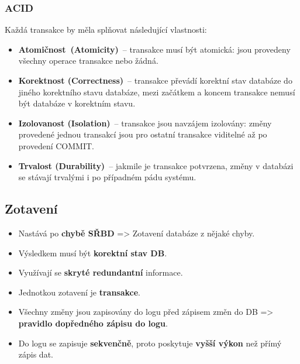 \subsubsection{ACID}
Každá transakce by měla splňovat následující vlastnosti:
\begin{itemize}
\item\textbf{Atomičnost (Atomicity)} -- transakce musí být atomická: jsou provedeny všechny operace transakce nebo žádná.
\item\textbf{Korektnost (Correctness)} – transakce převádí korektní stav databáze do jiného korektního stavu databáze, mezi začátkem a koncem transakce nemusí být databáze v korektním stavu.
\item\textbf{Izolovanost (Isolation)} – transakce jsou navzájem izolovány: změny provedené jednou transakcí jsou pro ostatní transakce viditelné až po provedení COMMIT. 
\item\textbf{Trvalost (Durability)} – jakmile je transakce potvrzena, změny v databázi se stávají trvalými i po případném pádu systému.
\end{itemize}

\subsection{Zotavení}
\begin{itemize}
\item Nastává po \textbf{chybě SŘBD} => Zotavení databáze z nějaké chyby.
\item Výsledkem musí být \textbf{korektní stav DB}.
\item Využívají se\textbf{ skryté redundantní} informace.
\item Jednotkou zotavení je \textbf{transakce}.
\item Všechny změny jsou zapisovány do logu před zápisem změn do DB => \textbf{pravidlo dopředného zápisu do logu}.
\item Do logu se zapisuje \textbf{sekvenčně}, proto poskytuje \textbf{vyšší výkon} než přímý zápis dat.
\end{itemize}

